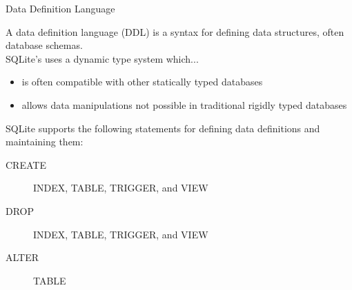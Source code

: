 \documentclass{beamer}
\begin{document}
\begin{frame}{Data Definition Language} \footnotesize 

A data definition language (DDL) is a syntax for defining data structures, often database schemas. \\

\vspace{12pt}
SQLite's uses a dynamic type system which...
\begin{itemize} \setlength\itemindent{-5pt}
\item is often compatible with other statically typed databases
\item allows data manipulations not possible in traditional rigidly typed databases
\end{itemize}


\vspace{8pt} SQLite supports the following statements for defining data definitions and maintaining them:

\vspace{6pt} \begin{description}
\item[CREATE] INDEX, TABLE, TRIGGER, and VIEW
\item[DROP] INDEX, TABLE, TRIGGER, and VIEW
\item[ALTER] TABLE
\end{description}

\end{frame}
\end{document}
